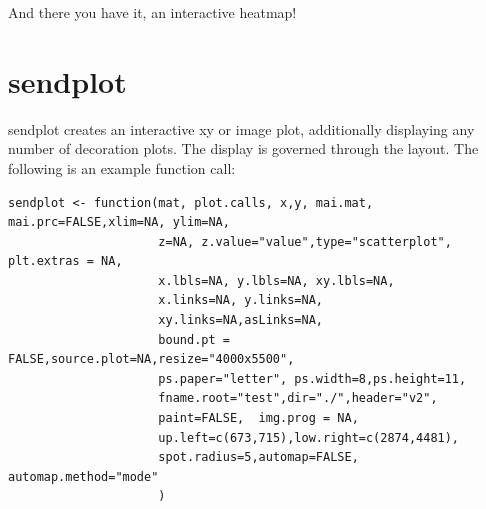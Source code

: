 \documentclass[]{article}
\begin{document}
And there you have it, an interactive heatmap! 



\newpage


\section{sendplot}

\indent sendplot creates an interactive xy or image plot, additionally displaying any number of decoration plots. The display is governed through the layout. The following is an example function call:
\begin{verbatim}
sendplot <- function(mat, plot.calls, x,y, mai.mat, mai.prc=FALSE,xlim=NA, ylim=NA,
                     z=NA, z.value="value",type="scatterplot", plt.extras = NA,
                     x.lbls=NA, y.lbls=NA, xy.lbls=NA,
                     x.links=NA, y.links=NA,
                     xy.links=NA,asLinks=NA,
                     bound.pt = FALSE,source.plot=NA,resize="4000x5500", 
                     ps.paper="letter", ps.width=8,ps.height=11,
                     fname.root="test",dir="./",header="v2",
                     paint=FALSE,  img.prog = NA,
                     up.left=c(673,715),low.right=c(2874,4481),
                     spot.radius=5,automap=FALSE, automap.method="mode"
                     )
\end{verbatim}
\end{document}
